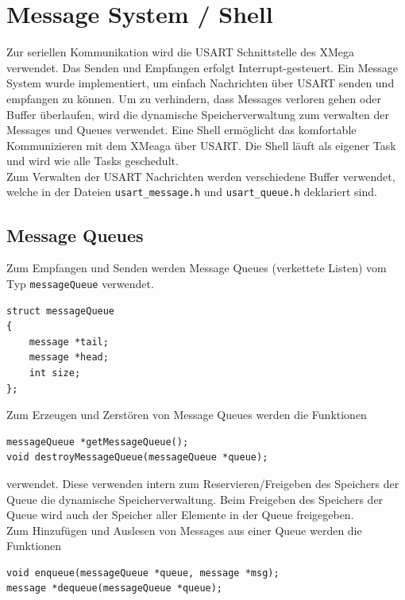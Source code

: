 \documentclass[fontsize=12pt, toc=bibliography, notitlepage]{scrreprt}
\begin{document}
\chapter{Message System / Shell}
\label{chap:die-shell}
Zur seriellen Kommunikation wird die USART Schnittstelle des XMega verwendet. Das Senden und Empfangen erfolgt Interrupt-gesteuert. Ein Message System wurde implementiert, um einfach Nachrichten über USART senden und empfangen zu können. Um zu verhindern, dass Messages verloren gehen oder Buffer überlaufen, wird die dynamische Speicherverwaltung zum verwalten der Messages und Queues verwendet. Eine Shell ermöglicht das komfortable Kommunizieren mit dem XMeaga über USART. Die Shell läuft als eigener Task und wird wie alle Tasks geschedult.\\

Zum Verwalten der USART Nachrichten werden verschiedene Buffer verwendet, welche in der Dateien \lstinline$usart_message.h$ und \lstinline$usart_queue.h$ deklariert sind.

\section{Message Queues}
\label{subsec:shell-queue}
Zum Empfangen und Senden werden Message Queues (verkettete Listen) vom Typ \lstinline$messageQueue$ verwendet.\\

\begin{lstlisting}
struct messageQueue
{
	message *tail;
	message *head;
	int size;
};
\end{lstlisting}

Zum Erzeugen und Zerstören von Message Queues werden die Funktionen

\begin{lstlisting}
messageQueue *getMessageQueue();
void destroyMessageQueue(messageQueue *queue);
\end{lstlisting}

verwendet. Diese verwenden intern zum Reservieren/Freigeben des Speichers der Queue die dynamische Speicherverwaltung. Beim Freigeben des Speichers der Queue wird auch der Speicher aller Elemente in der Queue freigegeben.\\

Zum Hinzufügen und Auslesen von Messages aus einer Queue werden die Funktionen

\begin{lstlisting}
void enqueue(messageQueue *queue, message *msg);
message *dequeue(messageQueue *queue);
\end{lstlisting}
\end{document}

